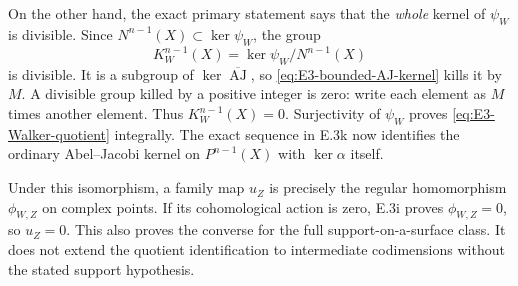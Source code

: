On the other hand, the exact primary statement
\citet[Theorem 2.3, author p.~12]{cyACMVWalker2022} says
that the \emph{whole} kernel of $\psi_W$ is divisible.
Since $N^{n-1}(X)\subset\ker\psi_W$, the group
\[
 K_W^{n-1}(X)=\ker\psi_W/N^{n-1}(X)
\]
is divisible. It is a subgroup of
$\ker\overline{\operatorname{AJ}}$, so
\eqref{eq:E3-bounded-AJ-kernel} kills it by $M$.
A divisible group killed by a positive integer is zero:
write each element as $M$ times another element. Thus
$K_W^{n-1}(X)=0$. Surjectivity of $\psi_W$ proves
\eqref{eq:E3-Walker-quotient} integrally. The exact sequence
in E.3k now identifies the ordinary Abel--Jacobi kernel on
$P^{n-1}(X)$ with $\ker\alpha$ itself.

Under this isomorphism, a family map $u_Z$ is precisely the
regular homomorphism $\phi_{W,Z}$ on complex points. If its
cohomological action is zero, E.3i proves
$\phi_{W,Z}=0$, so $u_Z=0$. This also proves the converse
for the full support-on-a-surface class. It does not extend
the quotient identification to intermediate codimensions
without the stated support hypothesis.
